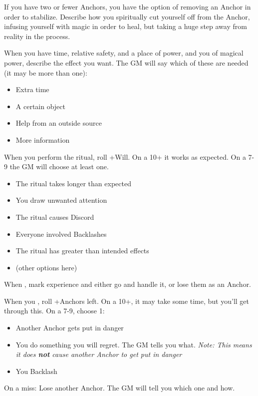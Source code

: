 \begin{multicols}{3}
\begin{move}
    If you have two or fewer Anchors, you have the option of removing
    an Anchor in order to stabilize. Describe how you spiritually cut
    yourself off from the Anchor, infusing yourself with magic in
    order to heal, but taking a huge step away from reality in the
    process.
  \end{move}

  \columnbreak
  
  \begin{move}
    When you have time, relative safety, and a place of power, and you
     of magical power, describe the effect you
    want. The GM will say which of these are needed (it may be more
    than one):
    \begin{itemize}
      \setlength\itemsep{0em}
    \item Extra time
    \item A certain object
    \item Help from an outside source
    \item More information
    \end{itemize}
    When you perform the ritual, roll +Will. On a 10+ it works as
    expected. On a 7-9 the GM will choose at least one.
    \begin{itemize}
      \setlength\itemsep{0em}
    \item The ritual takes longer than expected
    \item You draw unwanted attention
    \item The ritual causes Discord
    \item Everyone involved Backlashes
    \item The ritual has greater than intended effects
    \item (other options here)
    \end{itemize}
  \end{move}

  \SEPARATOR

  \begin{move}
    When , mark
    experience and either go and handle it, or lose them as an
    Anchor.
  \end{move}

  \SEPARATOR

  \begin{move}
    When you , roll +Anchors left. On a 10+,
    it may take some time, but you'll get through this. On a 7-9,
    choose 1:
    \begin{itemize}
      \setlength\itemsep{0em}
    \item Another Anchor gets put in danger
    \item You do something you will regret. The GM tells you
      what. \textit{Note: This means it does \textbf{not} cause
        another Anchor to get put in danger}
      \item You Backlash
    \end{itemize}
    On a miss: Lose another Anchor. The GM will tell you which one and
    how.
  \end{move}


\end{multicols}
